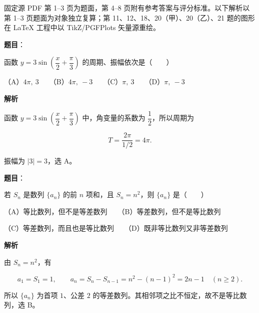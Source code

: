 

\begin{gktip}
固定源 PDF 第 1–3 页为题面，第 4–8 页附有参考答案与评分标准。以下解析以第 1–3 页题面为对象独立复算；第 11、12、18、20（甲）、20（乙）、21 题的图形在 LaTeX 工程中以 TikZ/PGFPlots 矢量源重绘。
\end{gktip}


\begin{answer}

\textbf{题目}：

函数 $y=3\sin\left(\dfrac{x}{2}+\dfrac\pi3\right)$ 的周期、振幅依次是\mbox{（　　）}

（A）$4\pi,\ 3$　　（B）$4\pi,\ -3$　　（C）$\pi,\ 3$　　（D）$\pi,\ -3$

\textbf{解析}

函数 $y=3\sin\left(\dfrac{x}{2}+\dfrac\pi3\right)$ 中，角变量的系数为 $\dfrac12$，所以周期为

\nopagebreak[4]
\[
T=\frac{2\pi}{1/2}=4\pi.
\]

振幅为 $|3|=3$，选 A。


\end{answer}
\begin{answer}

\textbf{题目}：

若 $S_n$ 是数列 $\{a_n\}$ 的前 $n$ 项和，且 $S_n=n^2$，则 $\{a_n\}$ 是\mbox{（　　）}

（A）等比数列，但不是等差数列　　（B）等差数列，但不是等比数列

（C）等差数列，而且也是等比数列　　（D）既非等比数列又非等差数列

\textbf{解析}

由 $S_n=n^2$，有

\nopagebreak[4]
\[
a_1=S_1=1,\qquad
a_n=S_n-S_{n-1}=n^2-(n-1)^2=2n-1\quad(n\ge2).
\]

所以 $\{a_n\}$ 为首项 $1$、公差 $2$ 的等差数列。其相邻项之比不恒定，故不是等比数列，选 B。


\end{answer}
